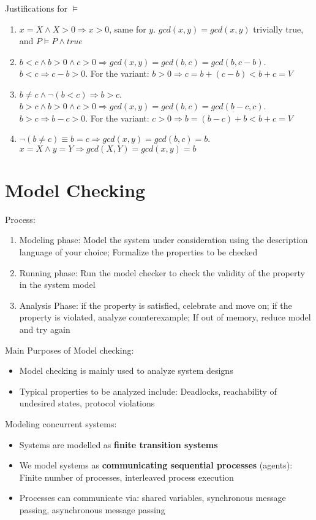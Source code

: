 \documentclass[11.5pt]{article}
\begin{document}
\begin{enumerate}
    Justifications for $\vDash$
    \begin{enumerate}[label=(\arabic*)]
        \item $x=X \land X > 0 \Rightarrow x>0$, same for $y$. $gcd(x,y)=gcd(x,y)$ trivially true, and $P \vDash P \land true$
        \item $b < c \land b > 0 \land c >0 \Rightarrow gcd(x,y)=gcd(b,c)=gcd(b, c-b)$. $b<c \Rightarrow c-b>0$. 
        For the variant: $b>0 \Rightarrow c = b +(c-b) < b+c = V$
        \item $b \neq c \land \lnot(b<c) \Rightarrow b>c.$  $b > c  \land b > 0 \land c >0 \Rightarrow gcd(x,y)=gcd(b,c)=gcd(b-c, c)$. $b>c \Rightarrow b-c>0$. 
        For the variant: $c>0 \Rightarrow b = (b-c)+b < b+c = V$
        \item $\lnot(b \neq c) \equiv b = c \Rightarrow gcd(x,y)=gcd(b,c)=b$. $x=X \land y=Y \Rightarrow gcd(X,Y)=gcd(x,y)=b$
    \end{enumerate}
\end{enumerate}

\section{Model Checking}
Process: 
\begin{enumerate}
    \item Modeling phase: Model the system under consideration using the description language of your choice;
    Formalize the properties to be checked
    \item Running phase: Run the model checker to check the validity of the property in the system model
    \item Analysis Phase: if the property is satisfied, celebrate and move on; if the property is violated, analyze counterexample;
    If out of memory, reduce model and try again
\end{enumerate}
\smallskip
Main Purposes of Model checking:
\begin{itemize}
    \item Model checking is mainly used to analyze system designs
    \item Typical properties to be analyzed include: Deadlocks, reachability of undesired states, protocol violations
\end{itemize}
\smallskip
Modeling concurrent systems:
\begin{itemize}
    \item Systems are modelled as \textbf{finite transition systems}
    \item We model systems as \textbf{communicating sequential processes} (agents): Finite number of processes, interleaved process execution
    \item Processes can communicate via: shared variables, synchronous message passing, asynchronous message passing
\end{itemize}
\end{document}
